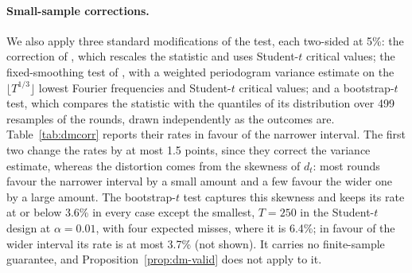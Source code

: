 \paragraph{Small-sample corrections.}
We also apply three standard modifications of the test, each two-sided at
5\%: the correction of \citet{harvey1997testing}, which rescales the
statistic and uses Student-$t$ critical values; the fixed-smoothing test
of \citet{coroneo2020comparing}, with a weighted periodogram variance
estimate on the $\lfloor T^{1/3}\rfloor$ lowest Fourier frequencies and
Student-$t$ critical values; and a bootstrap-$t$ test, which compares the
statistic with the quantiles of its distribution over 499 resamples of the
rounds, drawn independently as the outcomes are. Table~\ref{tab:dmcorr}
reports their rates in favour of the narrower interval. The first two
change the rates by at most 1.5 points, since they correct the variance
estimate, whereas the distortion comes from the skewness of $d_t$: most
rounds favour the narrower interval by a small amount and a few favour the
wider one by a large amount. The bootstrap-$t$ test captures this skewness
and keeps its rate at or below 3.6\% in every case except the smallest,
$T=250$ in the Student-$t$ design at $\alpha=0.01$, with four expected
misses, where it is 6.4\%; in favour of the wider interval its rate is at
most 3.7\% (not shown). It carries no finite-sample guarantee, and
Proposition~\ref{prop:dm-valid} does not apply to it.


\begin{table}[t]
\centering\small
\caption{Error rates (\%) under equal expected scores. DM: two-sided 5\%
Diebold--Mariano test at $T$, split by the forecaster it declares better.
Error by $T$: the 95\% confidence sequence excludes zero at some round up
to $T$ (asymptotic: from round 31). $Tp_A$: mean number of misses of the
narrower interval. 1000 replications.}
\label{tab:null}

\end{table}

\begin{table}[t]
\centering\small
\caption{Rejection rates (\%) in favour of the narrower interval under
equal expected scores, in the design of Table~\ref{tab:null}. DM: Diebold--Mariano
test with normal critical values; HLN: with the correction of
\citet{harvey1997testing}; WPE: fixed-smoothing test of
\citet{coroneo2020comparing}; bootstrap: bootstrap-$t$ test. All two-sided
at 5\%, so the nominal rate is 2.5\%. 1000 replications.}
\label{tab:dmcorr}

\end{table}

